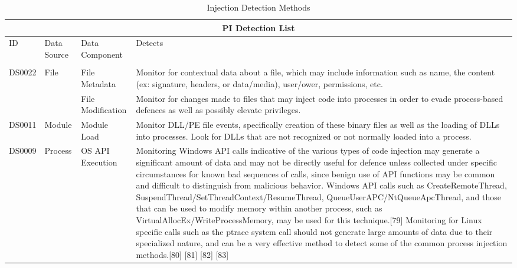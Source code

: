 \documentclass{article}
\begin{document}
\begin{table}[!ht]
\centering
\caption{Injection Detection Methods \autocite{Mitre:2017}}
\begin{tabular}{ |p{1.2cm}||p{2cm}|p{3cm}|p{8cm}|  }
  \hline
  \multicolumn{4}{|c|}{PI Detection List} \\
  \hline
  ID	& Data Source & Data Component & Detects \\
  \hline
   & & & \\
  DS0022 & File & File Metadata & Monitor for contextual data about a file, which may include information such as name,
                                  the content (ex: signature, headers, or data/media), user/ower, permissions, etc. \\
        & & File Modification & Monitor for changes made to files that may inject code into processes in order to evade
                                process-based defences as well as possibly elevate privileges. \\
  \hline
  DS0011 & Module & Module Load & Monitor DLL/PE file events, specifically creation of these binary files as well as
                                  the loading of DLLs into processes. Look for DLLs that are not recognized or not
                                  normally loaded into a process. \\
  \hline
  DS0009 & Process & OS API Execution & Monitoring Windows API calls indicative of the various types of code injection
                                        may generate a significant amount of data and may not be directly useful for
                                        defence unless collected under specific circumstances for known bad sequences
                                        of calls, since benign use of API functions may be common and difficult to
                                        distinguish from malicious behavior. Windows API calls such as CreateRemoteThread,
                                        SuspendThread/SetThreadContext/ResumeThread, QueueUserAPC/NtQueueApcThread, and
                                        those that can be used to modify memory within another process, such as
                                        VirtualAllocEx/WriteProcessMemory, may be used for this technique.[79] Monitoring
                                        for Linux specific calls such as the ptrace system call should not generate large
                                        amounts of data due to their specialized nature, and can be a very effective
                                        method to detect some of the common process injection methods.[80] [81] [82] [83] \\

\end{tabular}
\end{table}
\end{document}
